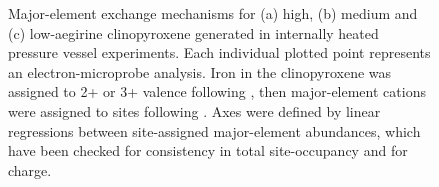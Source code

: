 \documentclass[final,authoryear,3p,times,twocolumn]{elsarticle}
\begin{document}
\begin{figure}[htpb]
\begin{center}
\begin{minipage}[c]{.47\linewidth}
\end{minipage}\hfill
\begin{minipage}[c]{0.47\textwidth}
\caption[Major-element exchange mechanisms]{Major-element exchange mechanisms for (a) high, (b) medium and (c) low-aegirine clinopyroxene generated in internally heated pressure vessel experiments. Each individual plotted point represents an electron-microprobe analysis. Iron in the clinopyroxene was assigned to 2+ or 3+ valence following \citet{Droop1987}, then major-element cations were assigned to sites following \citet[][see supplement \ref{EXCEL_D_Model}]{Morimoto1989}. Axes were defined by linear regressions between site-assigned major-element abundances, which have been checked for consistency in total site-occupancy and for charge.}
\label{SF_ExchMech}
\end{minipage}
\end{center}
\end{figure}
\end{document}
